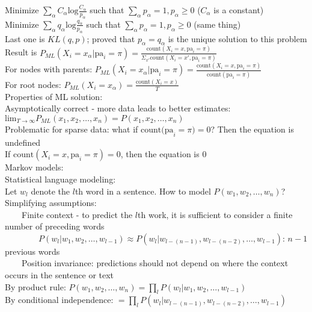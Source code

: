 \documentclass[10pt,letterpaper,unboxed,cm]{article}
\newcommand{\tab}{~~~~}
\begin{document}
Minimize $\sum_{\alpha}C_{\alpha} \text{log}\frac{C_{\alpha}}{p_{\alpha}}$ such that $\sum_{\alpha}p_{\alpha} = 1, p_{\alpha} \geq 0$ ($C_{\alpha}$ is a constant)\\
Minimize $\sum_{\alpha}q_{\alpha} \text{log}\frac{q_{\alpha}}{p_{\alpha}}$ such that $\sum_{\alpha}p_{\alpha} = 1, p_{\alpha} \geq 0$ (same thing)\\
Last one is $KL(q,p)$; proved that $p_{\alpha} = q_{\alpha}$ is the unique solution to this problem\\
Result is $P_{ML}(X_i = x_{\alpha}|\text{pa}_i = \pi) = \frac{\text{count}(X_i = x, \text{pa}_i = \pi)}{\Sigma_{x'} \text{count}(X_i = x', \text{pa}_i = \pi)}$\\
For nodes with parents: $P_{ML}(X_i = x_{\alpha}|\text{pa}_i = \pi) = \frac{\text{count}(X_i = x, \text{pa}_i = \pi)}{\text{count}(\text{pa}_i = \pi)}$\\
For root nodes: $P_{ML}(X_i = x_{\alpha}) = \frac{\text{count}(X_i = x)}{T}$\\
Properties of ML solution: \\
Asymptotically correct - more data leads to better estimates: $\text{lim}_{T \to \infty}P_{ML}(x_1, x_2, \ldots, x_n) = P(x_1, x_2, \ldots, x_n)$\\
Problematic for sparse data: what if $\text{count(pa}_i = \pi) = 0$? Then the equation is undefined\\
If $\text{count}(X_i = x, \text{pa}_i = \pi) = 0$, then the equation is 0\\
Markov models: \\
Statistical language modeling: \\
Let $w_l$ denote the $l$th word in a sentence. How to model $P(w_1, w_2, \ldots, w_n)$?\\
Simplifying assumptions: \\
\tab Finite context - to predict the $l$th work, it is sufficient to consider a finite number of preceding words\\
\tab \tab $P(w_l|w_1, w_2, \ldots, w_{l-1}) \approx P(w_l|w_{l-(n-1)}, w_{l-(n-2)}, \ldots, w_{l-1})$: $n-1$ previous words\\
\tab Position invariance: predictions should not depend on where the context occurs in the sentence or text\\
By product rule: $P(w_1, w_2, \ldots, w_n) = \prod_l P(w_l|w_1, w_2, \ldots, w_{l-1})$\\
By conditional independence: $ = \prod_l P(w_l|w_{l-(n-1)}, w_{l-(n-2)}, \ldots, w_{l-1})$\\
\end{document}
